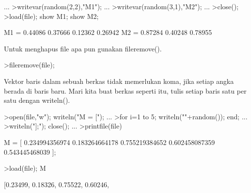 \documentclass[a4paper,10pt]{article}
\begin{document}
\begin{eulernotebook}
\begin{eulercomment}
\begin{eulercomment}
\begin{eulercomment}
\begin{eulercomment}
\begin{eulercomment}
\begin{eulercomment}
\begin{eulercomment}
\begin{eulercomment}
\begin{eulercomment}
\begin{eulercomment}
\begin{eulercomment}
\begin{eulercomment}
\begin{eulercomment}
\begin{eulercomment}
\begin{eulercomment}
\begin{eulercomment}
\begin{eulercomment}
\begin{eulercomment}
\begin{eulercomment}
\begin{eulercomment}
\begin{eulercomment}
\begin{eulercomment}
\begin{eulercomment}
\begin{eulercomment}
\begin{eulercomment}
\begin{eulercomment}
\begin{eulercomment}
\begin{eulercomment}
\begin{eulercomment}
\begin{eulercomment}
\begin{eulercomment}
\begin{eulercomment}
\begin{eulercomment}
\begin{eulercomment}
\begin{eulercomment}
\begin{eulercomment}
\begin{eulercomment}
\begin{eulercomment}
\begin{eulercomment}
\begin{eulercomment}
\begin{eulercomment}
\begin{eulercomment}
\begin{eulercomment}
\begin{eulercomment}
\begin{eulercomment}
\begin{eulercomment}
\begin{eulercomment}
\begin{eulercomment}
\begin{eulercomment}
\begin{eulercomment}
\begin{eulercomment}
\begin{eulercomment}
\begin{eulercomment}
\begin{eulercomment}
\begin{eulercomment}
\begin{eulercomment}
\begin{eulercomment}
\begin{eulercomment}
\begin{eulercomment}
\begin{eulercomment}
\begin{eulercomment}
\begin{eulercomment}
\begin{eulercomment}
\begin{eulercomment}
\begin{eulercomment}
\begin{eulercomment}
\begin{eulercomment}
\begin{eulercomment}
\begin{eulercomment}
\begin{eulercomment}
\begin{eulerprompt}
...
>writevar(random(2,2),"M1"); ...
>writevar(random(3,1),"M2"); ...
>close();
>load(file); show M1; show M2;
\end{eulerprompt}
\begin{euleroutput}
  M1 = 
    0.44086   0.37666 
    0.12362   0.26942 
  M2 = 
    0.87284 
    0.40248 
    0.78955 
\end{euleroutput}
\begin{eulercomment}
Untuk menghapus file apa pun gunakan fileremove().
\end{eulercomment}
\begin{eulerprompt}
>fileremove(file);
\end{eulerprompt}
\begin{eulercomment}
Vektor baris dalam sebuah berkas tidak memerlukan koma, jika setiap
angka berada di baris baru. Mari kita buat berkas seperti itu, tulis
setiap baris satu per satu dengan writeln().
\end{eulercomment}
\begin{eulerprompt}
>open(file,"w"); writeln("M = ["); ...
>for i=1 to 5; writeln(""+random()); end; ...
>writeln("];"); close(); ...
>printfile(file)
\end{eulerprompt}
\begin{euleroutput}
  M = [
  0.234994356974
  0.183264664178
  0.755219384652
  0.602458087359
  0.543445468039
  ];
\end{euleroutput}
\begin{eulerprompt}
>load(file); M
\end{eulerprompt}
\begin{euleroutput}
  [0.23499,  0.18326,  0.75522,  0.60246,  
\end{euleroutput}
\end{eulercomment}
\end{eulercomment}
\end{eulercomment}
\end{eulercomment}
\end{eulercomment}
\end{eulercomment}
\end{eulercomment}
\end{eulercomment}
\end{eulercomment}
\end{eulercomment}
\end{eulercomment}
\end{eulercomment}
\end{eulercomment}
\end{eulercomment}
\end{eulercomment}
\end{eulercomment}
\end{eulercomment}
\end{eulercomment}
\end{eulercomment}
\end{eulercomment}
\end{eulercomment}
\end{eulercomment}
\end{eulercomment}
\end{eulercomment}
\end{eulercomment}
\end{eulercomment}
\end{eulercomment}
\end{eulercomment}
\end{eulercomment}
\end{eulercomment}
\end{eulercomment}
\end{eulercomment}
\end{eulercomment}
\end{eulercomment}
\end{eulercomment}
\end{eulercomment}
\end{eulercomment}
\end{eulercomment}
\end{eulercomment}
\end{eulercomment}
\end{eulercomment}
\end{eulercomment}
\end{eulercomment}
\end{eulercomment}
\end{eulercomment}
\end{eulercomment}
\end{eulercomment}
\end{eulercomment}
\end{eulercomment}
\end{eulercomment}
\end{eulercomment}
\end{eulercomment}
\end{eulercomment}
\end{eulercomment}
\end{eulercomment}
\end{eulercomment}
\end{eulercomment}
\end{eulercomment}
\end{eulercomment}
\end{eulercomment}
\end{eulercomment}
\end{eulercomment}
\end{eulercomment}
\end{eulercomment}
\end{eulercomment}
\end{eulercomment}
\end{eulercomment}
\end{eulercomment}
\end{eulercomment}
\end{eulercomment}
\end{eulernotebook}
\end{document}
